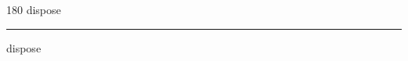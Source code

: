 
\begin{frame}
\begin{center}
\begin{turn}{180}
{\fontsize{2.5cm}{1em}\selectfont dispose}
\end{turn}
\vspace{1em}\par  
\hrule
\vspace{1em}\par  
{\fontsize{2.5cm}{1em}\selectfont dispose}
\end{center}
\end{frame}
